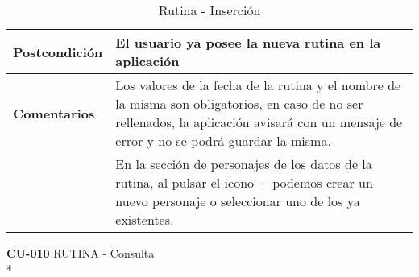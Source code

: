 \documentclass[../pfc.tex]{subfiles}
\begin{document}
\begin{table}[H]
\begin{tabular}[t]{|p{3cm}|p{9.5cm}|}
				\hline \textbf{Postcondición} & El usuario ya posee la nueva rutina en la aplicación \\* 
				\hline \textbf{Comentarios}   & Los valores de la fecha de la rutina y el nombre de la misma son obligatorios, en caso de no ser rellenados, la aplicación avisará con un mensaje de error y no se podrá guardar la misma.\\*
				& En la sección de personajes de los datos de la rutina, al pulsar el icono + podemos crear un nuevo personaje o seleccionar uno de los ya existentes.\\*
				\hline
			\end{tabular}
			\caption{Rutina - Inserción}
			\label{tabla:caso009}
		\end{table}
	
	\clearpage
		
	\textbf{CU-010}	RUTINA - Consulta\\*
		
\end{document}
